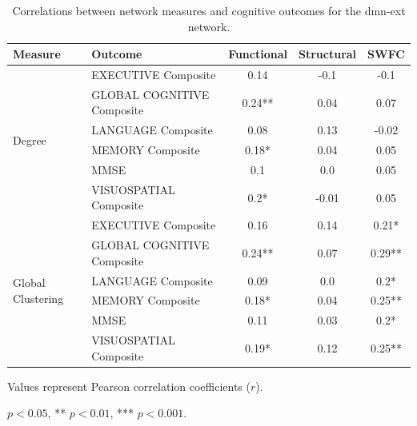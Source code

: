 \begin{table}[htbp]
\centering
\begin{threeparttable}
\caption{Correlations between network measures and cognitive outcomes for the dmn-ext network.}
\small
\begin{tabular}{llccc}
\toprule
Measure & Outcome & Functional & Structural & SWFC \\
\midrule
\multirow{6}{*}{Degree} & EXECUTIVE Composite & 0.14 & -0.1 & -0.1 \\
& GLOBAL COGNITIVE Composite & 0.24** & 0.04 & 0.07 \\
& LANGUAGE Composite & 0.08 & 0.13 & -0.02 \\
& MEMORY Composite & 0.18* & 0.04 & 0.05 \\
& MMSE & 0.1 & 0.0 & 0.05 \\
& VISUOSPATIAL Composite & 0.2* & -0.01 & 0.05 \\
\midrule
\multirow{6}{*}{Global Clustering} & EXECUTIVE Composite & 0.16 & 0.14 & 0.21* \\
& GLOBAL COGNITIVE Composite & 0.24** & 0.07 & 0.29** \\
& LANGUAGE Composite & 0.09 & 0.0 & 0.2* \\
& MEMORY Composite & 0.18* & 0.04 & 0.25** \\
& MMSE & 0.11 & 0.03 & 0.2* \\
& VISUOSPATIAL Composite & 0.19* & 0.12 & 0.25** \\
\bottomrule
\end{tabular}
\begin{tablenotes}
\footnotesize
\item Values represent Pearson correlation coefficients ($r$).
\item * $p<0.05$, ** $p<0.01$, *** $p<0.001$.
\end{tablenotes}
\end{threeparttable}
\end{table}




